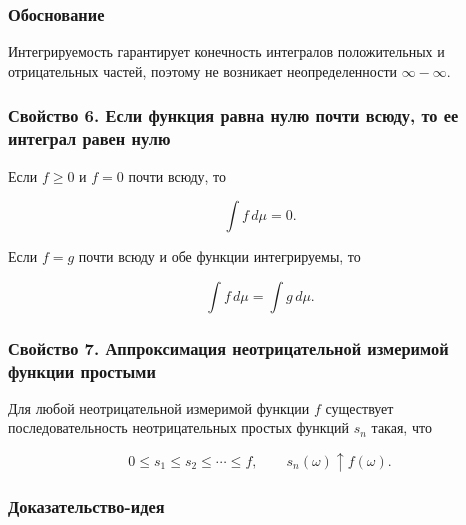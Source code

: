 \documentclass[
  11pt,
  a4paper,
]{article}
\begin{document}
\subsubsection{Обоснование}\label{ux43eux431ux43eux441ux43dux43eux432ux430ux43dux438ux435}

Интегрируемость гарантирует конечность интегралов положительных и
отрицательных частей, поэтому не возникает неопределенности
\(\infty-\infty\).

\subsubsection{Свойство 6. Если функция равна нулю почти всюду, то ее
интеграл равен
нулю}\label{ux441ux432ux43eux439ux441ux442ux432ux43e-6.-ux435ux441ux43bux438-ux444ux443ux43dux43aux446ux438ux44f-ux440ux430ux432ux43dux430-ux43dux443ux43bux44e-ux43fux43eux447ux442ux438-ux432ux441ux44eux434ux443-ux442ux43e-ux435ux435-ux438ux43dux442ux435ux433ux440ux430ux43b-ux440ux430ux432ux435ux43d-ux43dux443ux43bux44e}

Если \(f\ge0\) и \(f=0\) почти всюду, то

\[
\int f\,d\mu=0.
\]

Если \(f=g\) почти всюду и обе функции интегрируемы, то

\[
\int f\,d\mu=\int g\,d\mu.
\]

\subsubsection{Свойство 7. Аппроксимация неотрицательной измеримой
функции
простыми}\label{ux441ux432ux43eux439ux441ux442ux432ux43e-7.-ux430ux43fux43fux440ux43eux43aux441ux438ux43cux430ux446ux438ux44f-ux43dux435ux43eux442ux440ux438ux446ux430ux442ux435ux43bux44cux43dux43eux439-ux438ux437ux43cux435ux440ux438ux43cux43eux439-ux444ux443ux43dux43aux446ux438ux438-ux43fux440ux43eux441ux442ux44bux43cux438}

Для любой неотрицательной измеримой функции \(f\) существует
последовательность неотрицательных простых функций \(s_n\) такая, что

\[
0\le s_1\le s_2\le\cdots\le f,
\qquad
s_n(\omega)\uparrow f(\omega).
\]

\subsubsection{Доказательство-идея}\label{ux434ux43eux43aux430ux437ux430ux442ux435ux43bux44cux441ux442ux432ux43e-ux438ux434ux435ux44f-2}
\end{document}
